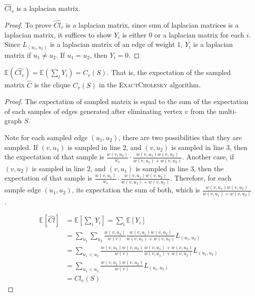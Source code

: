 \documentclass[11pt]{article}
\newcommand{\samp}[1]{\widehat{#1}}
\newcommand{\exactcholesky}{\textsc{ExactCholesky }}
\newcommand{\Exp}{\mathbb{E}}
\begin{document}
\begin{lemma}
    $\widehat{Cl}_v$ is a laplacian matrix.
\end{lemma}

\begin{proof}
    To prove $\widehat{Cl}_v$ is a laplacian matrix, since sum of laplacian matrices is a laplacian matrix, it suffices to show $Y_i$ is either $0$ or a laplacian matrix for each $i$. Since $L_{(u_1, u_2)}$ is a laplacian matrix of an edge of weight $1$, $Y_i$ is a laplacian matrix if $u_1 \neq u_2$. If $u_1 = u_2$, then $Y_i = 0$.
\end{proof}


\begin{lemma}\label{lem:expcl}
     $\mathbb{E}(\widehat{Cl_v}) = \mathbb{E}(\sum_{i}Y_{i}) = C_v(S)$. That is, the expectation of the sampled matrix $\samp{C}$ is the clique $C_v(S)$ in the \exactcholesky algorithm. 
\end{lemma}

\begin{proof}
    The expectation of sampled matrix is equal to the sum of the expectation of each samples of edges generated after eliminating vertex $v$ from the multi-graph $S$.

    Note for each sampled edge $(u_1, u_2)$, there are two possibilities that they are sampled. If $(v, u_1)$ is sampled in line 2, and $(v, u_2)$ is sampled in line 3, then the expectation of that sample is $\frac{w(v, u_2)}{w_v} \cdot \frac{w(v,u_1)w(v,u_2)}{w(v,u_1) + w(v,u_2)}$. Another case, if $(v, u_2)$ is sampled in line 2, and $(v, u_1)$ is sampled in line 3, then the expectation of that sample is $\frac{w(v, u_1)}{w_v} \cdot \frac{w(v,u_1)w(v,u_2)}{w(v,u_1) + w(v,u_2)}$. Therefore, for each sample edge $(u_1, u_2)$, its expectation the sum of both, which is $\frac{w(v,u_1)w(v,u_2)}{w(v,u_1) + w(v,u_2)}$. 


    \begin{align*}
    \Exp[\widehat{Cl}] &= \Exp\left[\sum_{i}Y_{i}\right] = \sum_{i}\Exp[Y_i] \\
    &= \sum_{u_1}\sum_{u_2}\frac{w(v,u_2)}{w(v)}\frac{w(v,u_1)w(v,u_2)}{w(v,u_1) + w(v,u_2)}L_{(u_1,u_2)} \\
    &= \sum_{u_1<u_2}\frac{w(v,u_1) w(v,u_2)}{w(v)}\frac{w(v,u_1)+w(v,u_2)}{w(v,u_1) + w(v,u_2)}L_{(u_1,u_2)} \\
    &= \sum_{u_1<u_2}\frac{w(v,u_1) w(v,u_2)}{w(v)}L_{(u_1,u_2)} \\
    &= Cl_v(S)
    \end{align*}
\end{proof} 
\end{document}
